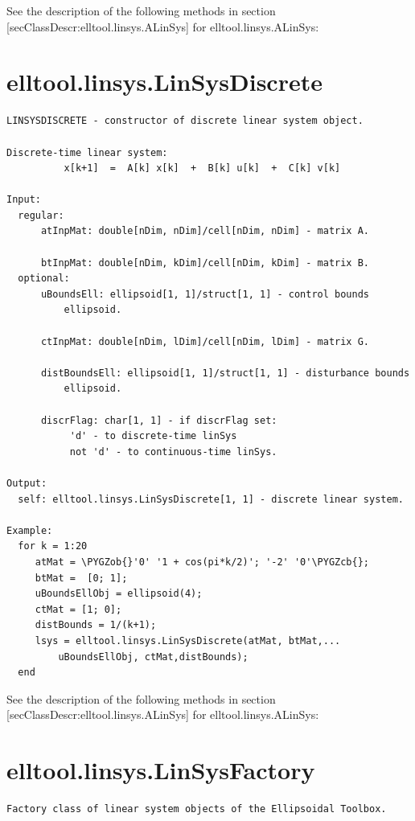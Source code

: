 \documentclass[letterpaper,10pt,english]{sphinxmanual}
\def\PYGZob{\char`\{}
\def\PYGZcb{\char`\}}
\begin{document}
See the description of the following methods in section
{[}secClassDescr:elltool.linsys.ALinSys{]} for elltool.linsys.ALinSys:


\section{elltool.linsys.LinSysDiscrete}
\label{chap_func:elltool-linsys-linsysdiscrete}
\begin{Verbatim}[commandchars=\\\{\}]
LINSYSDISCRETE - constructor of discrete linear system object.

Discrete-time linear system:
          x[k+1]  =  A[k] x[k]  +  B[k] u[k]  +  C[k] v[k]

Input:
  regular:
      atInpMat: double[nDim, nDim]/cell[nDim, nDim] - matrix A.

      btInpMat: double[nDim, kDim]/cell[nDim, kDim] - matrix B.
  optional:
      uBoundsEll: ellipsoid[1, 1]/struct[1, 1] - control bounds
          ellipsoid.

      ctInpMat: double[nDim, lDim]/cell[nDim, lDim] - matrix G.

      distBoundsEll: ellipsoid[1, 1]/struct[1, 1] - disturbance bounds
          ellipsoid.

      discrFlag: char[1, 1] - if discrFlag set:
           'd' - to discrete-time linSys
           not 'd' - to continuous-time linSys.

Output:
  self: elltool.linsys.LinSysDiscrete[1, 1] - discrete linear system.

Example:
  for k = 1:20
     atMat = \PYGZob{}'0' '1 + cos(pi*k/2)'; '-2' '0'\PYGZcb{};
     btMat =  [0; 1];
     uBoundsEllObj = ellipsoid(4);
     ctMat = [1; 0];
     distBounds = 1/(k+1);
     lsys = elltool.linsys.LinSysDiscrete(atMat, btMat,...
         uBoundsEllObj, ctMat,distBounds);
  end
\end{Verbatim}

See the description of the following methods in section
{[}secClassDescr:elltool.linsys.ALinSys{]} for elltool.linsys.ALinSys:


\section{elltool.linsys.LinSysFactory}
\label{chap_func:elltool-linsys-linsysfactory}
\begin{Verbatim}[commandchars=\\\{\}]
Factory class of linear system objects of the Ellipsoidal Toolbox.
\end{Verbatim}
\end{document}

